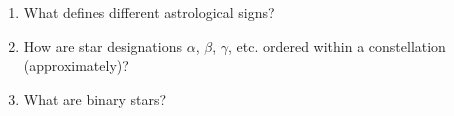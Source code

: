 
\begin{enumerate}
\item What defines different astrological signs?
\vspace{80pt}
\item How are star designations $\alpha$, $\beta$, $\gamma$, etc. ordered
  within a constellation (approximately)?
\vspace{80pt}
\item What are binary stars?
\vspace{80pt}
\end{enumerate}
